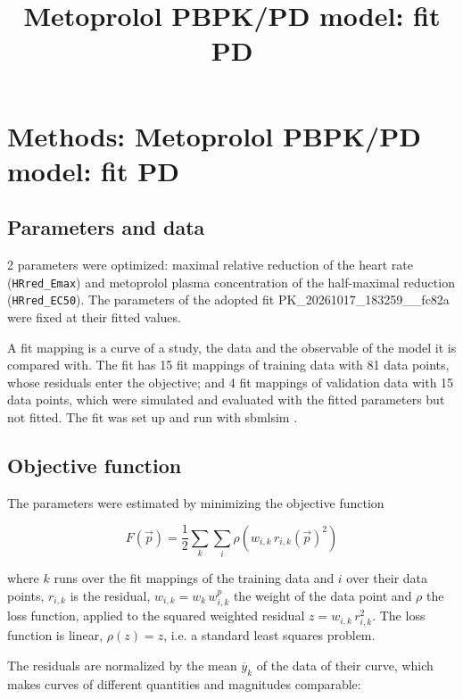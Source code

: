 \documentclass{article}
\title{Metoprolol PBPK/PD model: fit PD}
\date{}
\begin{document}
\maketitle

\section{Methods: Metoprolol PBPK/PD model: fit PD}

\subsection{Parameters and data}

2 parameters were optimized: maximal relative reduction of the heart rate (\texttt{HRred\_Emax}) and metoprolol plasma concentration of the half-maximal reduction (\texttt{HRred\_EC50}). The parameters of the adopted fit PK\_20261017\_183259\_\_fc82a were fixed at their fitted values.

A fit mapping is a curve of a study, the data and the observable of the model it is compared with. The fit has 15 fit mappings of training data with 81 data points, whose residuals enter the objective; and 4 fit mappings of validation data with 15 data points, which were simulated and evaluated with the fitted parameters but not fitted. The fit was set up and run with sbmlsim \cite{Koenig2026_sbmlsim}.

\subsection{Objective function}

The parameters were estimated by minimizing the objective function

\begin{equation}
F(\vec{p}) = \frac{1}{2} \sum_{k} \sum_{i} \rho\left(w_{i,k}\, r_{i,k}(\vec{p})^2\right)
\end{equation}

where $k$ runs over the fit mappings of the training data and $i$ over their data points, $r_{i,k}$ is the residual, $w_{i,k} = w_k\, w^{p}_{i,k}$ the weight of the data point and $\rho$ the loss function, applied to the squared weighted residual $z = w_{i,k}\, r_{i,k}^2$. The loss function is linear, $\rho(z) = z$, i.e. a standard least squares problem.

The residuals are normalized by the mean $\overline{y}_k$ of the data of their curve, which makes curves of different quantities and magnitudes comparable:
\end{document}
